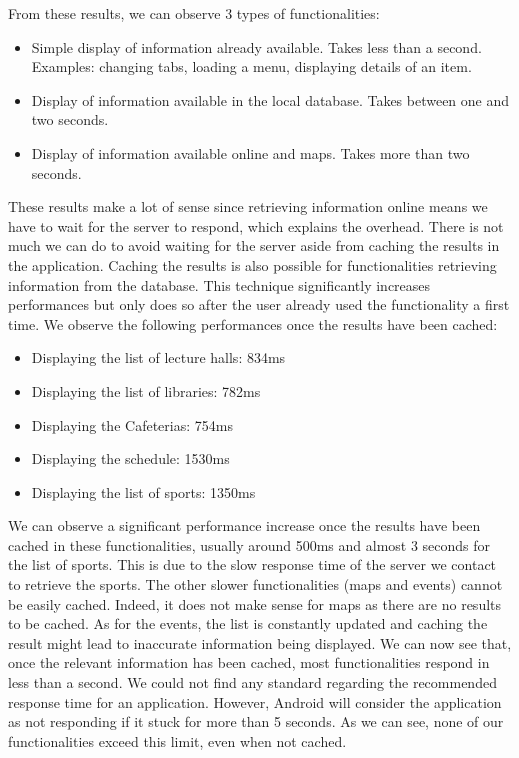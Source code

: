 \documentclass{eplmastersthesis}
\begin{document}
From these results, we can observe 3 types of functionalities:
\begin{itemize}
\item Simple display of information already available. Takes less than a second. Examples: changing tabs, loading a menu, displaying details of an item.
\item Display of information available in the local database. Takes between one and two seconds.
\item Display of information available online and maps. Takes more than two seconds.
\end{itemize}
These results make a lot of sense since retrieving information online means we have to wait for the server to respond, which explains the overhead. There is not much we can do to avoid waiting for the server aside from caching the results in the application. Caching the results is also possible for functionalities retrieving information from the database. This technique significantly increases performances but only does so after the user already used the functionality a first time. We observe the following performances once the results have been cached:
\begin{itemize}
\item Displaying the list of lecture halls: 834ms
\item Displaying the list of libraries: 782ms
\item Displaying the Cafeterias: 754ms
\item Displaying the schedule: 1530ms

\item Displaying the list of sports: 1350ms
\end{itemize}
We can observe a significant performance increase once the results have been cached in these functionalities, usually around 500ms and almost 3 seconds for the list of sports. This is due to the slow response time of the server we contact to retrieve the sports. The other slower functionalities (maps and events) cannot be easily cached. Indeed, it does not make sense for maps as there are no results to be cached. As for the events, the list is constantly updated and caching the result might lead to inaccurate information being displayed.
We can now see that, once the relevant information has been cached, most functionalities respond in less than a second. We could not find any standard regarding the recommended response time for an application. However, Android will consider the application as not responding if it stuck for more than 5 seconds. As we can see, none of our functionalities exceed this limit, even when not cached.\\
\end{document}
